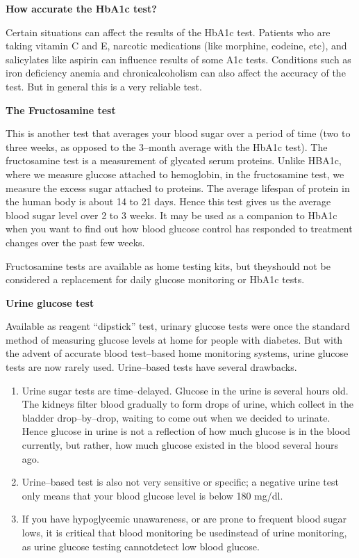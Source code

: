 \noindent\textbf{How accurate the HbA1c test?}

Certain situations can affect the results of the HbA1c test. Patients who are taking vitamin C and E, narcotic medications (like morphine, codeine, etc), and salicylates like aspirin can influence results of some A1c tests. Conditions such as iron deficiency anemia and chronic\break alcoholism can also affect the accuracy of the test. But in general this is a very reliable test.

\noindent\textbf{The Fructosamine test}

This is another test that averages your blood sugar over a period of time (two to three weeks, as opposed to the 3–month average with the HbA1c test). The fructosamine test is a measurement of glycated serum proteins. Unlike HBA1c, where we measure glucose attached to hemoglobin, in the fructosamine test, we measure the excess sugar attached to proteins. The average lifespan of protein in the human body is about 14 to 21 days. Hence this test gives us the average blood sugar level over 2 to 3 weeks. It may be used as a companion to HbA1c when you want to find out how blood glucose control has responded to treatment changes over the past few weeks.

\clearpage

Fructosamine tests are available as home testing kits, but they\break should not be considered a replacement for daily glucose monitoring or HbA1c tests.

\noindent\textbf{Urine glucose test}

Available as reagent “dipstick” test, urinary glucose tests were once the standard method of measuring glucose levels at home for people with diabetes. But with the advent of accurate blood test–based home monitoring systems, urine glucose tests are now rarely used. Urine–based tests have several drawbacks.

\begin{enumerate}
\itemsep=0pt
\item Urine sugar tests are time–delayed. Glucose in the urine is seve\-ral hours old. The kidneys filter blood gradually to form drops of urine, which collect in the bladder drop–by–drop, waiting to come out when we decided to urinate. Hence glucose in urine is not a reflection of how much glucose is in the blood currently, but rather, how much glucose existed in the blood several hours ago.
\item Urine–based test is also not very sensitive or specific; a negative urine test only means that your blood glucose level is below 180 mg/dl.
\item If you have hypoglycemic unawareness, or are prone to frequent blood sugar lows, it is critical that blood monitoring be used\break instead of urine monitoring, as urine glucose testing cannot\break detect low blood glucose.
\end{enumerate}

